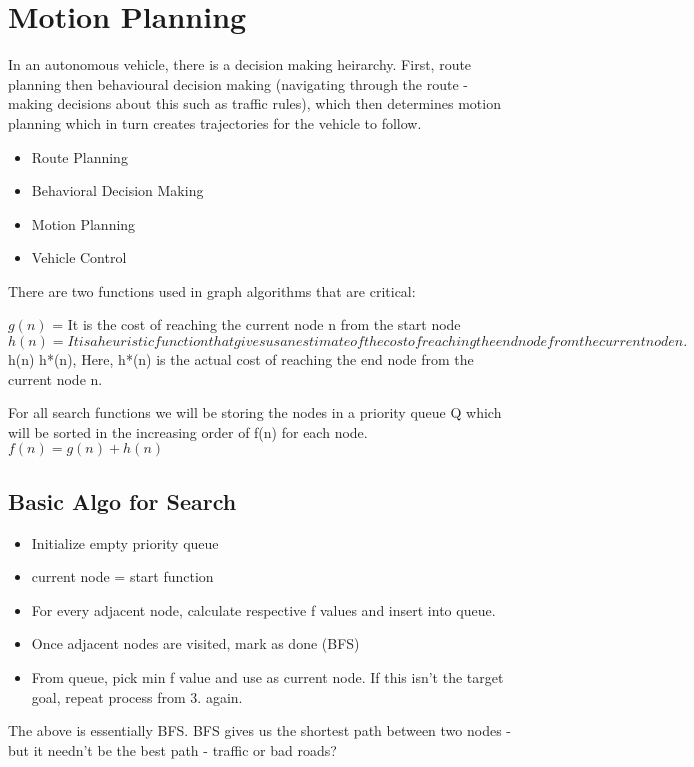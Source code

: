 \chapter{Motion Planning}

In an autonomous vehicle, there is a decision making heirarchy. First, route planning then behavioural decision making (navigating through the route - making decisions about this such as traffic rules), which then determines motion planning which in turn creates trajectories for the vehicle to follow.

\begin{itemize}
    \item Route Planning
    \item Behavioral Decision Making
    \item Motion Planning
    \item Vehicle Control
\end{itemize}

There are two functions used in graph algorithms that are critical:

$g(n)$ = It is the cost of reaching the current node n from the start node
$h(n) = It is a heuristic function that gives us an estimate of the cost of reaching the end node from the current node n.
$h(n) \leq h*(n), 
Here, h*(n) is the actual cost of reaching the end node from the current node n.

For all search functions we will be storing the nodes in a priority queue Q which will be sorted in the increasing order of f(n) for each node.
$f(n) = g(n) + h(n)$

\section{Basic Algo for Search}

\begin{itemize}
    \item Initialize empty priority queue
    \item current node = start function 
    \item For every adjacent node, calculate respective f values and insert into queue.
    \item Once adjacent nodes are visited, mark as done (BFS)
    \item From queue, pick min f value and use as current node. If this isn't the target goal, repeat process from 3. again.
\end{itemize}

The above is essentially BFS. BFS gives us the shortest path between two nodes - but it needn't be the best path - traffic or bad roads?


